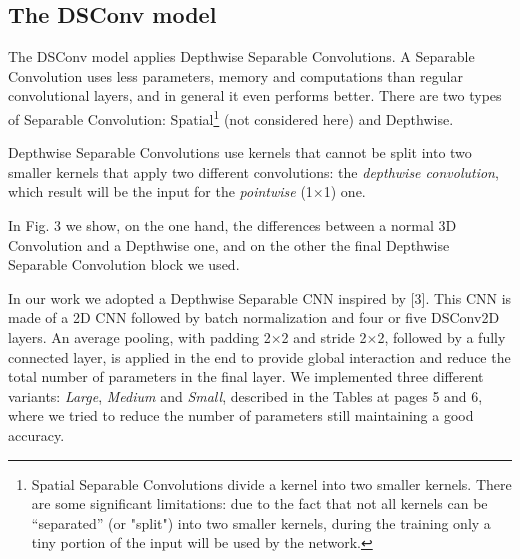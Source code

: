 \documentclass[conference]{IEEEtran}
\begin{document}
\subsection{The DSConv model}
The DSConv model applies Depthwise Separable Convolutions. A Separable Convolution uses less parameters,  memory and computations than regular convolutional layers, and in general it even performs better.
There are two types of Separable Convolution: Spatial\footnote{Spatial Separable Convolutions divide a kernel into two smaller kernels. There are some significant limitations: due to the fact that not all kernels can be “separated” (or "split") into two smaller kernels, during the training  only a tiny portion of the input will be used by the network.} (not considered here) and Depthwise.

Depthwise Separable Convolutions use kernels that cannot be split into two smaller kernels that apply two different convolutions: the \textit{depthwise convolution}, which result will be the input for the \textit{pointwise} (1$\times$1) one.

In Fig. 3 we show, on the one hand, the differences between a normal 3D Convolution and a Depthwise one, and on the other the final Depthwise Separable Convolution block we used. 

In our work we adopted a Depthwise Separable CNN inspired by [3]. This CNN is made of a 2D CNN followed by batch normalization and four or five DSConv2D layers. An average pooling, with padding 2$\times$2 and stride 2$\times$2, followed by a fully connected layer, is applied in the end to provide global interaction and reduce the total number of parameters in the final layer.
We implemented three different variants: \textit{Large}, \textit{Medium} and \textit{Small}, described in the Tables at pages 5 and 6, where we tried to reduce the number of parameters still maintaining a good accuracy.
\end{document}
